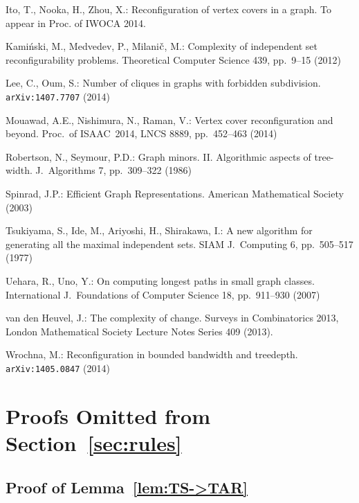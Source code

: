 \documentclass{llncs}
\begin{document}
\begin{thebibliography}{99}
Ito, T., Nooka, H., Zhou, X.:
Reconfiguration of vertex covers in a graph.
To appear in Proc. of IWOCA 2014. 

Kami\'nski, M., Medvedev, P., Milani${\rm \check{c}}$, M.: 
Complexity of independent set reconfigurability problems.
Theoretical Computer Science 439, pp.~9--15 (2012)

Lee, C., Oum, S.:
Number of cliques in graphs with forbidden subdivision.
{\tt  arXiv:1407.7707} (2014)

Mouawad, A.E., Nishimura, N., Raman, V.: 
Vertex cover reconfiguration and beyond.
Proc.~of ISAAC~2014, LNCS 8889, pp.~452--463 (2014)

Robertson, N., Seymour, P.D.: 
Graph minors. I\hspace{-.1em}I. Algorithmic aspects of tree-width. 
J.~Algorithms 7, pp.~309--322 (1986)

Spinrad, J.P.:
Efficient Graph Representations.
American Mathematical Society (2003)

Tsukiyama, S., Ide, M., Ariyoshi, H., Shirakawa, I.:
A new algorithm for generating all the maximal independent sets.
SIAM J.~Computing 6, pp.~505--517 (1977)

Uehara, R., Uno, Y.:
On computing longest paths in small graph classes.
International J.~Foundations of Computer Science 18, pp.~911--930 (2007)

van den Heuvel, J.:
The complexity of change.
Surveys in Combinatorics 2013, 
London Mathematical Society Lecture Notes Series 409 (2013).

Wrochna, M.:
Reconfiguration in bounded bandwidth and treedepth.
{\tt  arXiv:1405.0847} (2014)

\end{thebibliography}

\newpage
\appendix

	\section{Proofs Omitted from Section~\ref{sec:rules}}
	
	\subsection{Proof of Lemma~\ref{lem:TS->TAR}}
\end{document}
